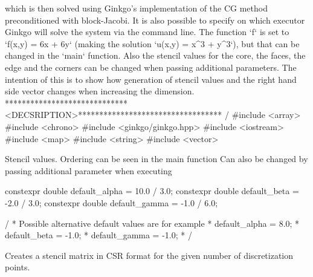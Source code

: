 \begin{DoxyCode}
which is then solved \textcolor{keyword}{using} Ginkgo\textcolor{stringliteral}{'s implementation of the CG method}
\textcolor{stringliteral}{preconditioned with block-Jacobi. It is also possible to specify on which}
\textcolor{stringliteral}{executor Ginkgo will solve the system via the command line.}
\textcolor{stringliteral}{The function `f` is set to `f(x,y) = 6x + 6y` (making the solution `u(x,y) = x^3}
\textcolor{stringliteral}{+ y^3`), but that can be changed in the `main` function. Also the stencil values}
\textcolor{stringliteral}{for the core, the faces, the edge and the corners can be changed when passing}
\textcolor{stringliteral}{additional parameters.}
\textcolor{stringliteral}{}
\textcolor{stringliteral}{The intention of this is to show how generation of stencil values and the right}
\textcolor{stringliteral}{hand side vector changes when increasing the dimension.}
\textcolor{stringliteral}{*****************************<DECSRIPTION>********************************** /}
\textcolor{stringliteral}{}
\textcolor{stringliteral}{#include <array>}
\textcolor{stringliteral}{#include <chrono>}
\textcolor{stringliteral}{#include <ginkgo/ginkgo.hpp>}
\textcolor{stringliteral}{#include <iostream>}
\textcolor{stringliteral}{#include <map>}
\textcolor{stringliteral}{#include <string>}
\textcolor{stringliteral}{#include <vector>}
\end{DoxyCode}


Stencil values. Ordering can be seen in the main function Can also be changed by passing additional parameter when executing


\begin{DoxyCode}
constexpr \textcolor{keywordtype}{double} default\_alpha = 10.0 / 3.0;
constexpr \textcolor{keywordtype}{double} default\_beta = -2.0 / 3.0;
constexpr \textcolor{keywordtype}{double} default\_gamma = -1.0 / 6.0;

/ * Possible alternative \textcolor{keywordflow}{default} values are \textcolor{keywordflow}{for} example
 * default\_alpha = 8.0;
 * default\_beta = -1.0;
 * default\_gamma = -1.0;
 * /
\end{DoxyCode}


Creates a stencil matrix in C\+SR format for the given number of discretization points.


